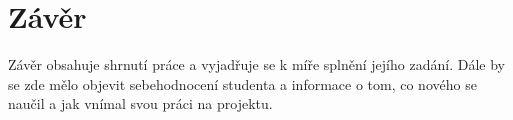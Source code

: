 \documentclass[11pt,a4paper,twoside,openright]{report}
\let\openright=\cleardoublepage
\begin{document}
\chapter*{Závěr}

\pagestyle{empty}

Závěr obsahuje shrnutí práce a vyjadřuje se k míře splnění jejího zadání. Dále by se zde mělo objevit sebehodnocení studenta a informace o tom, co nového se naučil a jak vnímal svou práci na projektu.

\printbibliography[title={Seznam použité literatury},heading={bibintoc}]

\openright
\listoffigures
{}

\clearpage
\listoftables
{}


\end{document}

